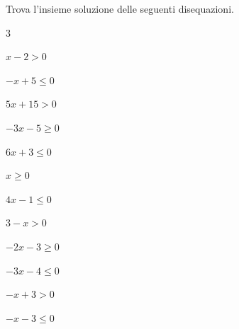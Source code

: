 \begin{esercizio}
\label{ese:dis_11}
Trova l'insieme soluzione delle seguenti disequazioni.
\begin{htmulticols}{3}
\begin{enumeratea}
\item \(x-2>0\)
\item \(-x+5\leqslant 0\)
\item \(5x+15>0\)
\item \(-3x-5\geqslant 0\)
\item \(6x+3\leqslant 0\)
\item \(x\geqslant 0\)
\item \(4x-1\leqslant 0\)
\item \(3-x>0\)
\item \(-2x-3\geqslant 0\)
\item \(-3x-4\leqslant 0\)
\item \(-x+3>0\)
\item \(-x-3\leqslant 0\)
\end{enumeratea}
\end{htmulticols}
\end{esercizio}



